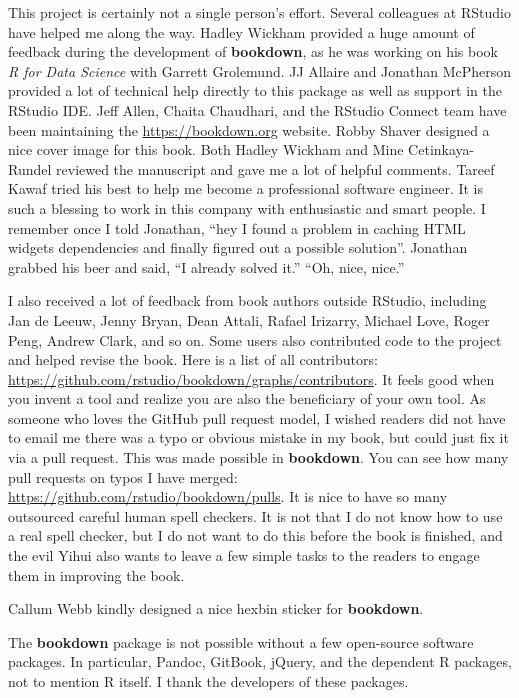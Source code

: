 \documentclass[
  12pt,
]{krantz}
\begin{document}
This project is certainly not a single person's effort. Several colleagues at RStudio have helped me along the way. Hadley Wickham provided a huge amount of feedback during the development of \textbf{bookdown}, as he was working on his book \emph{R for Data Science} with Garrett Grolemund. JJ Allaire and Jonathan McPherson provided a lot of technical help directly to this package as well as support in the RStudio IDE. Jeff Allen, Chaita Chaudhari, and the RStudio Connect team have been maintaining the \url{https://bookdown.org} website. Robby Shaver designed a nice cover image for this book. Both Hadley Wickham and Mine Cetinkaya-Rundel reviewed the manuscript and gave me a lot of helpful comments. Tareef Kawaf tried his best to help me become a professional software engineer. It is such a blessing to work in this company with enthusiastic and smart people. I remember once I told Jonathan, ``hey I found a problem in caching HTML widgets dependencies and finally figured out a possible solution''. Jonathan grabbed his beer and said, ``I already solved it.'' ``Oh, nice, nice.''

I also received a lot of feedback from book authors outside RStudio, including Jan de Leeuw, Jenny Bryan, Dean Attali, Rafael Irizarry, Michael Love, Roger Peng, Andrew Clark, and so on. Some users also contributed code to the project and helped revise the book. Here is a list of all contributors: \url{https://github.com/rstudio/bookdown/graphs/contributors}. It feels good when you invent a tool and realize you are also the beneficiary of your own tool. As someone who loves the GitHub pull request model, I wished readers did not have to email me there was a typo or obvious mistake in my book, but could just fix it via a pull request. This was made possible in \textbf{bookdown}. You can see how many pull requests on typos I have merged: \url{https://github.com/rstudio/bookdown/pulls}. It is nice to have so many outsourced careful human spell checkers. It is not that I do not know how to use a real spell checker, but I do not want to do this before the book is finished, and the evil Yihui also wants to leave a few simple tasks to the readers to engage them in improving the book.

Callum Webb kindly designed a nice hexbin sticker for \textbf{bookdown}.

The \textbf{bookdown} package is not possible without a few open-source software packages. In particular, Pandoc, GitBook, jQuery, and the dependent R packages, not to mention R itself. I thank the developers of these packages.
\end{document}
